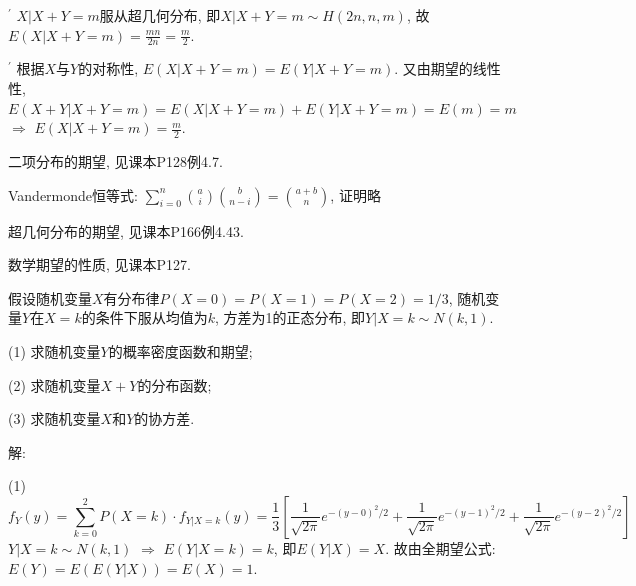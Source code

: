 \documentclass[standard]{ExBook}
\begin{document}
\begin{qitems}
\begin{bbox}
$^{'}$ $X|X+Y=m$服从超几何分布, 即$X|X+Y=m\sim H(2n,n,m)$, 故$E(X|X+Y=m)=\displaystyle\frac{mn}{2n}=\frac{m}{2}$.

$^{'}$ 根据$X$与$Y$的对称性, $E(X|X+Y=m)=E(Y|X+Y=m)$. 又由期望的线性性, $E(X+Y|X+Y=m)=E(X|X+Y=m)+E(Y|X+Y=m)=E(m)=m$ $\Longrightarrow$ $E(X|X+Y=m)=\displaystyle\frac{m}{2}$.

\textcolor{themeColor}{\selectfont {} 二项分布的期望, 见课本P128例4.7.}

\vspace{0.5em}

\textcolor{themeColor}{\selectfont {} Vandermonde恒等式: $\displaystyle\sum\limits_{i=0}^{n}\binom{a}{i}\binom{b}{n-i}=\binom{a+b}{n}$, 证明略}

\vspace{0.5em}

\textcolor{themeColor}{\selectfont {} 超几何分布的期望, 见课本P166例4.43.}

\textcolor{themeColor}{\selectfont {} 数学期望的性质, 见课本P127.}
    \end{bbox}

\vspace{-5em}

    \begin{bbox}
    \begin{shaded}
        \qitem
假设随机变量$ X $有分布律$ P(X = 0) = P(X = 1) = P(X = 2) = 1/3$, 随机变量$ Y$在$ X = k $的条件下服从均值为$ k$, 方差为1的正态分布, 即$Y|X=k\sim N(k,1)$.

(1) 求随机变量$Y$的概率密度函数和期望;

(2) 求随机变量$X+Y$的分布函数;

(3) 求随机变量$X$和$Y$的协方差.
    \end{shaded}
    \end{bbox}

\vspace{-5em}

    \begin{bbox}
解: 

(1) 
$$f_{Y}(y)=\displaystyle\sum\limits_{k=0}^{2}P(X=k)\cdot f_{Y|X=k}(y)=\frac{1}{3}\left[\frac{1}{\sqrt{2\pi}}e^{-(y-0)^2/2}+\frac{1}{\sqrt{2\pi}}e^{-(y-1)^2/2}+\frac{1}{\sqrt{2\pi}}e^{-(y-2)^2/2}\right]$$
$Y|X=k\sim N(k,1)$ $\Longrightarrow$ $E(Y|X=k)=k$, 即$E(Y|X)=X$. 故由全期望公式: $E(Y)=E(E(Y|X))=E(X)=1$.
    \end{bbox}

\vspace{-5em}


\end{qitems}
\end{document}
